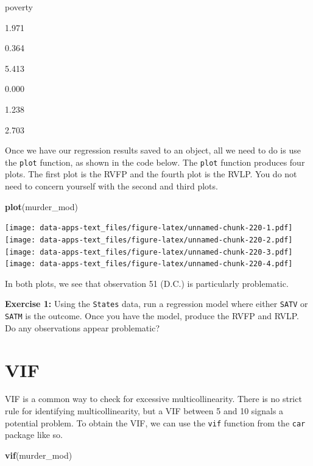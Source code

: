 \documentclass[
]{book}
\newenvironment{Shaded}{\begin{snugshade}}{\end{snugshade}}
\newcommand{\KeywordTok}[1]{\textcolor[rgb]{0.13,0.29,0.53}{\textbf{#1}}}
\newcommand{\NormalTok}[1]{#1}
\newenvironment{learncheck}%
{%
  \par\vspace{\baselineskip}\noindent 
  \color{Exercise}\begin{itshape}%
  \par\vspace{\baselineskip}\noindent\ignorespaces 
}%
{%
  \end{itshape}\ignorespacesafterend 
}
\begin{document}
poverty

1.971

0.364

5.413

0.000

1.238

2.703

Once we have our regression results saved to an object, all we need to do is use the \texttt{plot} function, as shown in the code below. The \texttt{plot} function produces four plots. The first plot is the RVFP and the fourth plot is the RVLP. You do not need to concern yourself with the second and third plots.

\begin{Shaded}
\begin{Highlighting}[]
\KeywordTok{plot}\NormalTok{(murder_mod)}
\end{Highlighting}
\end{Shaded}

\texttt{[image: data-apps-text\_files/figure-latex/unnamed-chunk-220-1.pdf]} \texttt{[image: data-apps-text\_files/figure-latex/unnamed-chunk-220-2.pdf]} \texttt{[image: data-apps-text\_files/figure-latex/unnamed-chunk-220-3.pdf]} \texttt{[image: data-apps-text\_files/figure-latex/unnamed-chunk-220-4.pdf]}

In both plots, we see that observation 51 (D.C.) is particularly problematic.

\begin{learncheck}
\textbf{Exercise 1:} Using the \texttt{States} data, run a regression
model where either \texttt{SATV} or \texttt{SATM} is the outcome. Once
you have the model, produce the RVFP and RVLP. Do any observations
appear problematic?
\end{learncheck}

\hypertarget{vif}{%
\section{VIF}\label{vif}}

VIF is a common way to check for excessive multicollinearity. There is no strict rule for identifying multicollinearity, but a VIF between 5 and 10 signals a potential problem. To obtain the VIF, we can use the \texttt{vif} function from the \texttt{car} package like so.

\begin{Shaded}
\begin{Highlighting}[]
\KeywordTok{vif}\NormalTok{(murder_mod)}
\end{Highlighting}
\end{Shaded}
\end{document}
